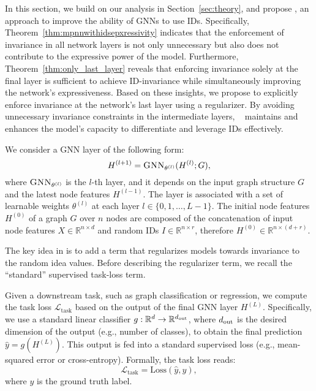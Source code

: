 




In this section, we build on our analysis in Section~\ref{sec:theory}, and propose \ourmethod, an approach to improve the ability of GNNs to use IDs.
Specifically, Theorem~\ref{thm:mpnnwithidsepxressivity} indicates that the enforcement of invariance in all network layers is not only unnecessary but also does not contribute to the expressive power of the model. Furthermore, Theorem~\ref{thm:only_last_layer} reveals that enforcing invariance solely at the final layer is sufficient to achieve ID-invariance while simultaneously improving the network's expressiveness.
Based on these insights, we propose to explicitly enforce invariance at the network's last layer using a regularizer. By avoiding unnecessary invariance constraints in the intermediate layers, \ourmethod~ maintains and enhances the model’s capacity to differentiate and leverage IDs effectively.

We consider a GNN layer of the following form:
\begin{equation*}
    \label{eq:general_gnn}
{H}^{(l+1)} = \textsc{GNN}_{\theta^{(l)}}({H}^{(l)}; G),
\end{equation*}
where $\textsc{GNN}_{\theta^{(l)}}$ is the $l$-th layer, and it depends on the input graph structure $G$ and the latest node features ${H}^{(l-1)}$. The layer is associated with a set of learnable weights \( \theta^{(l)} \) at each layer \( l \in \{0, 1, \dots, L-1\} \). The initial node features $H^{(0)}$ of a graph $G$ over $n$ nodes are composed of the concatenation of input node features $X  \in \mathbb{R}^{n \times d}$ and random IDs $I \in \mathbb{R}^{n \times r}$, therefore $H^{(0)} \in \mathbb{R}^{n \times (d+r)}$.

The key idea in {\ourmethod} is to add a term that regularizes models towards invariance to the random idea values. Before describing the regularizer term, we recall the ``standard'' supervised task-loss term.

Given a downstream task, such as graph classification or regression, we compute the task loss $ \mathcal{L}_{\text{task}}$ based on the output of the final GNN layer ${H}^{(L)}$. Specifically, we use a standard linear classifier $g: \mathbb{R}^{d} \rightarrow \mathbb{R}^{d_{\rm{out}}}$, where ${d_{\rm{out}}}$ is the desired dimension of the output (e.g., number of classes), to obtain the final prediction $\hat{y} = g({H}^{(L)})$. This output is fed into a standard supervised loss (e.g., mean-squared error or cross-entropy). Formally, the task loss reads:
\begin{equation*}
    \label{eq:task_loss}
\mathcal{L}_{\text{task}} = \text{Loss}( \hat{y}, y), 
\end{equation*}
where \( y \) is the ground truth label.

